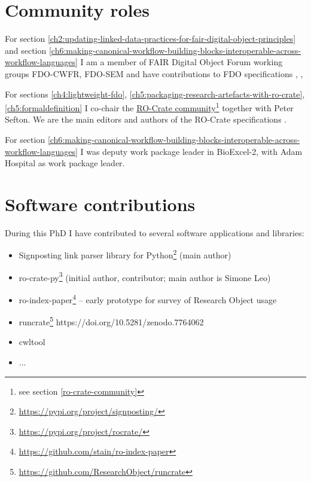 \section{Community roles}

For section \ref{ch2:updating-linked-data-practices-for-fair-digital-object-principles} and section \ref{ch6:making-canonical-workflow-building-blocks-interoperable-across-workflow-languages} I am a member of FAIR Digital Object Forum \cite{FAIRDigitalObjects} working groups FDO-CWFR, FDO-SEM and have contributions to FDO specifications \cite{fdo-RequirementSpec}, \cite{fdo-Overview}, 

For sections \ref{ch4:lightweight-fdo}, \ref{ch5:packaging-research-artefacts-with-ro-crate},  \ref{ch5:formaldefinition} I co-chair the
\href{https://www.researchobject.org/ro-crate/community}{RO-Crate
community}\footnote{see section \vref{ro-crate-community}} together with Peter Sefton. We are the main editors and authors of the RO-Crate specifications \cite{ch5-105,ch5-107,ch5-106}.

For section \ref{ch6:making-canonical-workflow-building-blocks-interoperable-across-workflow-languages} I was deputy work package leader in BioExcel-2, with Adam
Hospital as work package leader.



\section{Software contributions}

During this PhD I have contributed to several software applications and libraries:

\begin{itemize}
  \item  Signposting link parser library for Python\footnote{\url{https://pypi.org/project/signposting/}} \cite{10.5281/zenodo.7256713}  (main author)
  \item  ro-crate-py\footnote{\url{https://pypi.org/project/rocrate/}} \cite{ro-crate-py} (initial author, contributor; main author is Simone Leo)
  \item  ro-index-paper\footnote{\url{https://github.com/stain/ro-index-paper}} --  early prototype for survey of Research Object usage
  \item  runcrate\footnote{\url{https://github.com/ResearchObject/runcrate}} https://doi.org/10.5281/zenodo.7764062
  \item  cwltool
  \item ...
\end{itemize}


